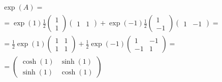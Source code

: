 
\begin{equation}\begin{split}
\exp{\left(A\right)}=\\
=\exp{\left(1\right)}\frac{1}{2}\left(\begin{matrix}1\\1\end{matrix}\right)\left(\begin{matrix}1&1\end{matrix}\right)+\exp{\left(-1\right)}\frac{1}{2}\left(\begin{matrix}1\\-1\end{matrix}\right)\left(\begin{matrix}1&-1\end{matrix}\right)=\\
=\frac{1}{2}\exp{\left(1\right)}\left(\begin{matrix}1&1\\1&1\end{matrix}\right)+\frac{1}{2}\exp{\left(-1\right)}\left(\begin{matrix}1&-1\\-1&1\end{matrix}\right)=\\
=\left(\begin{matrix}\cosh{\left(1\right)}&\sinh{\left(1\right)}\\\sinh{\left(1\right)}&\cosh{\left(1\right)}\end{matrix}\right)
\end{split}\end{equation}